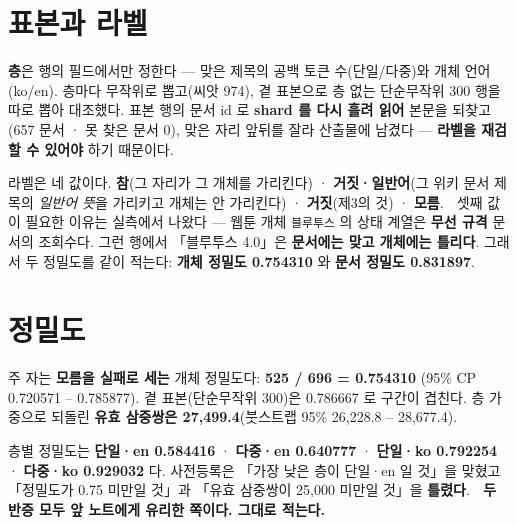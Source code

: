 \documentclass[10pt]{article}
\begin{document}

\section{표본과 라벨}

\textbf{층}은 행의 필드에서만 정한다 --- 맞은 제목의 공백 토큰 수(단일/다중)와 개체 언어(ko/en).
층마다 무작위로 뽑고(씨앗 974), 곁 표본으로 층 없는 단순무작위 300 행을 따로 뽑아 대조했다.
표본 행의 문서 id 로 \textbf{shard 를 다시 흘려 읽어} 본문을 되찾고(657 문서 · 못 찾은 문서
0), 맞은 자리 앞뒤를 잘라 산출물에 남겼다 --- \textbf{라벨을 재검할 수 있어야} 하기 때문이다.

라벨은 네 값이다. \textbf{참}(그 자리가 그 개체를 가리킨다) · \textbf{거짓·일반어}(그 위키 문서
제목의 \emph{일반어 뜻}을 가리키고 개체는 안 가리킨다) · \textbf{거짓}(제3의 것) · \textbf{모름}.
🔴 셋째 값이 필요한 이유는 실측에서 나왔다 --- 웹툰 개체 \texttt{블루투스} 의 상태 계열은
\textbf{무선 규격} 문서의 조회수다. 그런 행에서 「블루투스 4.0」은 \textbf{문서에는 맞고 개체에는
틀리다}. 그래서 두 정밀도를 같이 적는다: \textbf{개체 정밀도 0.754310} 와
\textbf{문서 정밀도 0.831897}.


\section{정밀도}

주 자는 \textbf{모름을 실패로 세는} 개체 정밀도다: \textbf{525 / 696 = 0.754310}
(95\% CP 0.720571 -- 0.785877). 곁 표본(단순무작위 300)은 0.786667 로 구간이 겹친다.
층 가중으로 되돌린 \textbf{유효 삼중쌍은 27,499.4}(붓스트랩 95\% 26,228.8 -- 28,677.4).

층별 정밀도는 \textbf{단일·en 0.584416} · \textbf{다중·en 0.640777} · \textbf{단일·ko 0.792254}
· \textbf{다중·ko 0.929032} 다. 사전등록은 「가장 낮은 층이 단일·en 일 것」을 맞혔고
「정밀도가 0.75 미만일 것」과 「유효 삼중쌍이 25,000 미만일 것」을 \textbf{틀렸다}.
🔴 \textbf{두 반증 모두 앞 노트에게 유리한 쪽이다. 그대로 적는다.}

\end{document}
